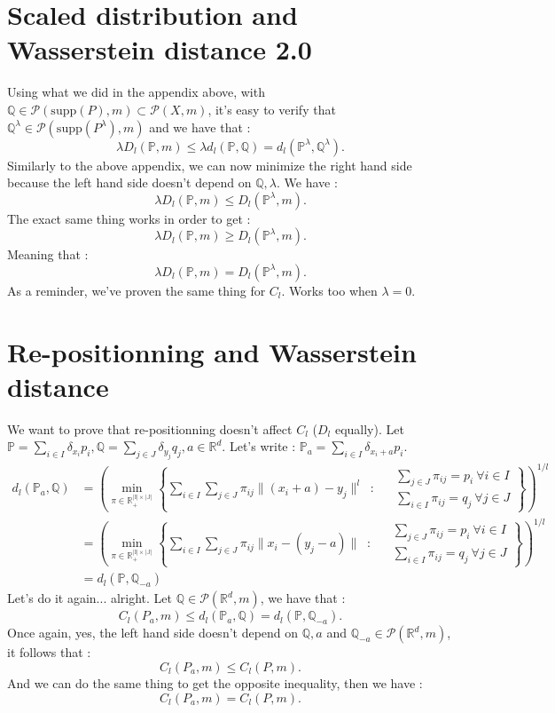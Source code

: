 \documentclass{amsart}
\newcommand{\RR}{\mathbb{R}}
\begin{document}
\section{Scaled distribution and Wasserstein distance 2.0}
\label{scaled 2}
Using what we did in the appendix above, with $\mathbb{Q}\in\mathcal{P}\left(\text{supp}\left(P\right),m\right)\subset \mathcal{P}(X,m)$, it's easy to verify that $\mathbb{Q}^\lambda\in\mathcal{P}\left(\text{supp}\left(P^\lambda\right),m\right)$ and we have that : $$\lambda D_l\left(\mathbb{P},m\right)\leq \lambda d_l\left(\mathbb{P},\mathbb{Q}\right)=d_l\left(\mathbb{P}^\lambda,\mathbb{Q}^\lambda\right).$$ 
Similarly to the above appendix, we can now minimize the right hand side because the left hand side doesn't depend on $\mathbb{Q}, \lambda$.
We have :
$$
\lambda D_l\left(\mathbb{P},m\right)\leq D_l\left(\mathbb{P}^\lambda,m\right).
$$
The exact same thing works in order to get : 
$$
\lambda D_l\left(\mathbb{P},m\right)\geq D_l\left(\mathbb{P}^\lambda,m\right).
$$
Meaning that : 
$$
\lambda D_l\left(\mathbb{P},m\right)=D_l\left(\mathbb{P}^\lambda,m\right).
$$
As a reminder, we've proven the same thing for $C_l$. Works too when $\lambda= 0$.
\section{Re-positionning and Wasserstein distance}
We want to prove that re-positionning doesn't affect $C_l$ ($D_l$ equally). Let $\mathbb{P}=\sum_{i\in I}\delta_{x_i}p_i,\mathbb{Q}=\sum_{j\in J}\delta_{y_j}q_j, a\in\RR^d$. Let's write : $\mathbb{P}_a=\sum_{i\in I}\delta_{x_i+a}p_i$. 
\begin{align*}
d_l(\mathbb{P}_a,\mathbb{Q})&=\left(\min_{\pi\in\mathbb{R_+^{|I|\times|J|}}}\left\{ 
\sum_{i\in I}\sum_{j\in J}\pi_{ij}\lVert (x_i+a)-y_j\rVert^l \: \text{ : } \:  \begin{aligned}
& \sum_{j\in J}\pi_{ij}=p_i \: \forall i\in I \\
& \sum_{i\in I}\pi_{ij}=q_j \: \forall j\in J
\end{aligned}\right\}\right)^{1/l}
\\ &= \left(\min_{\pi\in\mathbb{R_+^{|I|\times|J|}}}\left\{ 
\sum_{i\in I}\sum_{j\in J}\pi_{ij}\lVert x_i-(y_j-a)\rVert \: \text{ : } \:  \begin{aligned}
& \sum_{j\in J}\pi_{ij}=p_i \: \forall i\in I \\
& \sum_{i\in I}\pi_{ij}=q_j \: \forall j\in J
\end{aligned}\right\}\right)^{1/l}
\\ &=d_l\left(\mathbb{P},\mathbb{Q}_{-a}\right)
\end{align*}
Let's do it again... alright. Let $\mathbb{Q}\in\mathcal{P}\left(\RR^d,m\right)$, we have that :
$$
C_l\left(P_a,m\right)\leq d_l\left(\mathbb{P}_a,\mathbb{Q}\right)=d_l\left(\mathbb{P},\mathbb{Q}_{-a}\right).
$$
Once again, yes, the left hand side doesn't depend on $\mathbb{Q}, a$ and $\mathbb{Q}_{-a}\in\mathcal{P}\left(\RR^d,m\right)$, it follows that :
$$
C_l\left(P_a,m\right)\leq C_l\left(P,m\right).
$$
And we can do the same thing to get the opposite inequality, then we have : 
$$
C_l\left(P_a,m\right)= C_l\left(P,m\right).
$$
\end{document}
